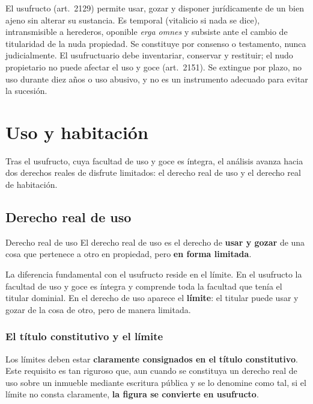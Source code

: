 \documentclass[12pt,oneside]{book}
\begin{document}
{}{El usufructo (art.~2129) permite usar, gozar y disponer jurídicamente de un bien ajeno sin alterar su sustancia. Es temporal (vitalicio si nada se dice), intransmisible a herederos, oponible \textit{erga omnes} y subsiste ante el cambio de titularidad de la nuda propiedad. Se constituye por consenso o testamento, nunca judicialmente. El usufructuario debe inventariar, conservar y restituir; el nudo propietario no puede afectar el uso y goce (art.~2151). Se extingue por plazo, no uso durante diez años o uso abusivo, y no es un instrumento adecuado para evitar la sucesión.}

\chapter{Uso y habitación}\label{cap:usohab}

Tras el usufructo, cuya facultad de uso y goce es íntegra, el análisis avanza hacia dos derechos reales de disfrute limitados: el derecho real de uso y el derecho real de habitación.

\section{Derecho real de uso}

\begin{definicion}{Derecho real de uso}
El derecho real de uso es el derecho de \textbf{usar y gozar} de una cosa que pertenece a otro en propiedad, pero \textbf{en forma limitada}.
\end{definicion}

La diferencia fundamental con el usufructo reside en el límite. En el usufructo la facultad de uso y goce es íntegra y comprende toda la facultad que tenía el titular dominial.
En el derecho de uso aparece el \textbf{límite}: el titular puede usar y gozar de la cosa de otro, pero de manera limitada.

\subsection{El título constitutivo y el límite}

Los límites deben estar \textbf{claramente consignados en el título constitutivo}. Este requisito es tan riguroso que, aun cuando se constituya un derecho real de uso sobre un inmueble mediante escritura pública y se lo denomine como tal, si el límite no consta claramente, \textbf{la figura se convierte en usufructo}.
\end{document}
